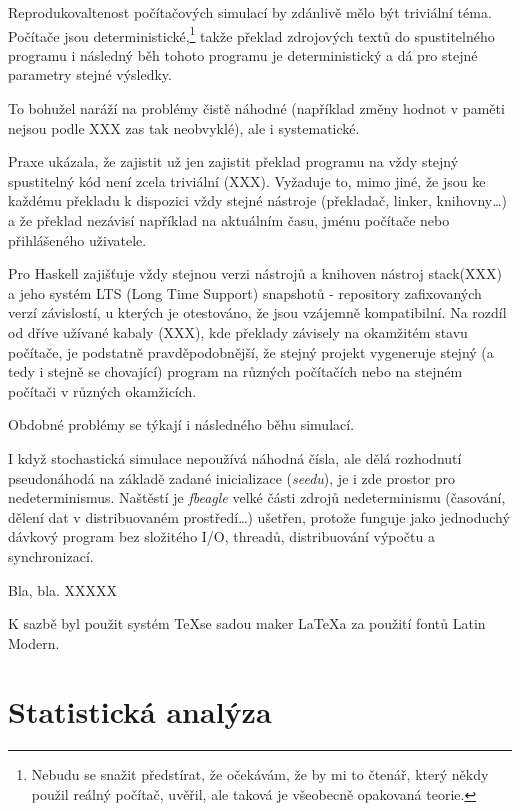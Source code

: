 \begin{tcolorbox}[ title={Reprodukovatelnost v počítačových simulacích}
                 , breakable
                 ]
Reprodukovaltenost počítačových simulací by zdánlivě mělo být triviální téma. Počítače jsou
deterministické,\footnote{
Nebudu se snažit předstírat, že očekávám, že by mi to čtenář, který někdy použil reálný počítač, uvěřil, ale
taková je všeobecně opakovaná teorie.
} takže překlad zdrojových textů do spustitelného programu i následný běh tohoto
programu je deterministický a dá pro stejné parametry stejné výsledky.

To bohužel naráží na problémy čistě náhodné (například  změny hodnot v paměti
nejsou podle XXX zas tak neobvyklé), ale i systematické.

Praxe ukázala, že zajistit už jen zajistit překlad programu na vždy stejný spustitelný kód není zcela triviální (XXX).
Vyžaduje to, mimo jiné, že jsou ke každému překladu k dispozici vždy stejné nástroje (překladač, linker,
knihovny\ldots) a že překlad nezávisí například na aktuálním času, jménu počítače nebo přihlášeného uživatele.

Pro Haskell zajišťuje vždy stejnou verzi nástrojů a knihoven nástroj stack(XXX) a jeho systém
LTS (Long Time Support) snapshotů - repository zafixovaných verzí závislostí, u kterých je
otestováno, že jsou vzájemně kompatibilní. Na rozdíl od dříve užívané kabaly (XXX), kde překlady
závisely na okamžitém stavu počítače, je podstatně pravděpodobnější, že stejný projekt vygeneruje
stejný (a tedy i stejně se chovající) program na různých počítačích nebo na stejném počítači v různých
okamžicích.

Obdobné problémy se týkají i následného běhu simulací.

I když stochastická simulace nepoužívá náhodná čísla, ale dělá rozhodnutí pseudonáhodá na základě zadané inicializace
(\textit{seedu}), je i zde prostor pro nedeterminismus. Naštěstí je \textit{fbeagle} velké části zdrojů
nedeterminismu (časování, dělení dat v distribuovaném prostředí\ldots) ušetřen, protože funguje jako
jednoduchý dávkový program bez složitého I/O, threadů, distribuování výpočtu a synchronizací.
\end{tcolorbox}



Bla, bla. XXXXX

K sazbě byl použit systém \TeX se sadou maker \LaTeX a za použití fontů Latin Modern.

\section{Statistická analýza}
